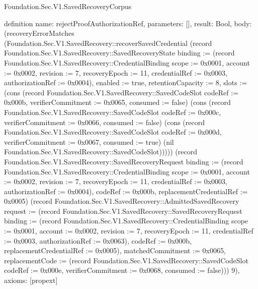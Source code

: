 \begin{lexlean}{Foundation.Sec.V1.SavedRecoveryCorpus}
\begin{semanticmodule}
definition{
  name: rejectProofAuthorizationRef,
  parameters: [],
  result: Bool,
  body: (recoveryErrorMatches (Foundation.Sec.V1.SavedRecovery::recoverSavedCredential (record Foundation.Sec.V1.SavedRecovery::SavedRecoveryState {binding := (record Foundation.Sec.V1.SavedRecovery::CredentialBinding {scope := 0x0001, account := 0x0002, revision := 7, recoveryEpoch := 11, credentialRef := 0x0003, authorizationRef := 0x0004}), enabled := true, retentionCapacity := 8, slots := (cons (record Foundation.Sec.V1.SavedRecovery::SavedCodeSlot {codeRef := 0x000b, verifierCommitment := 0x0065, consumed := false}) (cons (record Foundation.Sec.V1.SavedRecovery::SavedCodeSlot {codeRef := 0x000c, verifierCommitment := 0x0066, consumed := false}) (cons (record Foundation.Sec.V1.SavedRecovery::SavedCodeSlot {codeRef := 0x000d, verifierCommitment := 0x0067, consumed := true}) (nil Foundation.Sec.V1.SavedRecovery::SavedCodeSlot))))}) (record Foundation.Sec.V1.SavedRecovery::SavedRecoveryRequest {binding := (record Foundation.Sec.V1.SavedRecovery::CredentialBinding {scope := 0x0001, account := 0x0002, revision := 7, recoveryEpoch := 11, credentialRef := 0x0003, authorizationRef := 0x0004}), codeRef := 0x000b, replacementCredentialRef := 0x0005}) (record Foundation.Sec.V1.SavedRecovery::AdmittedSavedRecovery {request := (record Foundation.Sec.V1.SavedRecovery::SavedRecoveryRequest {binding := (record Foundation.Sec.V1.SavedRecovery::CredentialBinding {scope := 0x0001, account := 0x0002, revision := 7, recoveryEpoch := 11, credentialRef := 0x0003, authorizationRef := 0x0063}), codeRef := 0x000b, replacementCredentialRef := 0x0005}), matchedCommitment := 0x0065, replacementCode := (record Foundation.Sec.V1.SavedRecovery::SavedCodeSlot {codeRef := 0x000e, verifierCommitment := 0x0068, consumed := false})})) 9),
  axioms: [propext]
}


\end{semanticmodule}
\end{lexlean}

